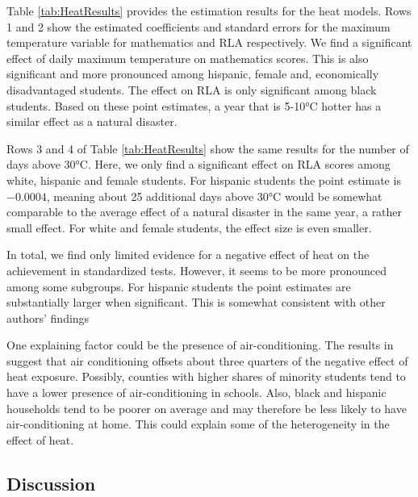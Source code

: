 Table \ref{tab:HeatResults} provides the estimation results for the heat models. Rows 1 and 2 show the estimated coefficients and standard errors for the maximum temperature variable for mathematics and RLA respectively. We find a significant effect of daily maximum temperature on mathematics scores. This is also significant and more pronounced among hispanic, female and, economically disadvantaged students. The effect on RLA is only significant among black students. Based on these point estimates, a year that is 5-10°C hotter has a similar effect as a natural disaster.



Rows 3 and 4 of Table \ref{tab:HeatResults} show the same results for the number of days above 30°C. Here, we only find a significant effect on RLA scores among white, hispanic and female students. For hispanic students the point estimate is $-0.0004$, meaning about 25 additional days above 30°C would be somewhat comparable to the average effect of a natural disaster in the same year, a rather small effect. For white and female students, the effect size is even smaller.

In total, we find only limited evidence for a negative effect of heat on the achievement in standardized tests. However, it seems to be more pronounced among some subgroups. For hispanic students the point estimates are substantially larger when significant. This is somewhat consistent with other authors' findings \citep[for example][]{Goodman_2020}

One explaining factor could be the presence of air-conditioning. The results in \cite{Goodman_2020} suggest that air conditioning offsets about three quarters of the negative effect of heat exposure. Possibly, counties with higher shares of minority students tend to have a lower presence of air-conditioning in schools. Also, black and hispanic households tend to be poorer on average and may therefore be less likely to have air-conditioning at home. This could explain some of the heterogeneity in the effect of heat.

\subsection{Discussion}

